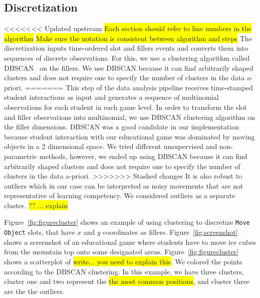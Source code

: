 \documentclass{sigchi}
\newcommand{\hl}[1]{\colorbox{yellow}{#1}}
\begin{document}
\subsection{Discretization}
<<<<<<< Updated upstream
\hl{Each section should refer to line numbers in the algorithm}
\hl{Make sure the notation is consistent between algorithm and steps}
The discretization inputs time-ordered slot and fillers events and converts them into sequences of discrete observations.
For this, we use a clustering algorithm called DBSCAN~\cite{ester1996density} on the fillers. 
We use DBSCAN because it %
can find arbitrarily shaped clusters and does not require one to specify the number of clusters in the data a-priori. 
=======
This step of the data analysis pipeline receives time-stamped student interactions as input and generates a sequence of multinomial observations for each student in each game level.
In order to transform the slot and filler observations into multinomial, we use DBSCAN clustering algorithm \cite{ester1996density} on the filler dimensions. 
DBSCAN was a good candidate in our implementation because student interaction with our educational game was dominated by moving objects in a 2 dimensional space.
We tried different unsupervised and non-parametric methods, however, we ended up using DBSCAN because it can find arbitrarily shaped clusters and does not require one to specify the number of clusters in the data a-priori. 
>>>>>>> Stashed changes
It is also robust to outliers which in our case can be interpreted as noisy movements that are not representative of learning competency. 
We considered outliers as a separate cluster. \hl{?? ... explain}

Figure~\ref{fig:figurecluster} shows an example of using clustering to discretize \texttt{Move Object} slots, that have $x$ and $y$ coordinates as fillers.
Figure~\ref{fig:screenshot} shows a screenshot of an educational game where students have to move ice cubes from the mountain top onto some designated areas.
Figure~\ref{fig:figurecluster} shows a scatterplot of \hl{write... you need to explain this}.
We colored the points according to the DBSCAN clustering.
In this example, we have three clusters,  cluster one and two represent the \hl{the most common positions}, and cluster three are the the outliers.
\end{document}
